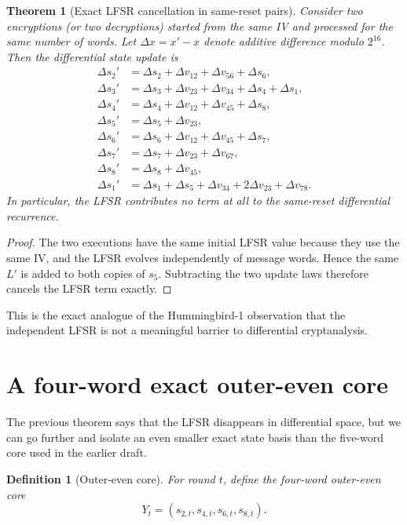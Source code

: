 \documentclass[11pt]{article}
\newtheorem{theorem}{Theorem}
\newtheorem{definition}{Definition}
\begin{document}
\begin{theorem}[Exact LFSR cancellation in same-reset pairs]
Consider two encryptions (or two decryptions) started from the same IV and processed for the same number of words. Let $\Delta x = x' - x$ denote additive difference modulo $2^{16}$. Then the differential state update is
\begin{align*}
\Delta s_2' &= \Delta s_2 + \Delta v_{12} + \Delta v_{56} + \Delta s_6,\\
\Delta s_3' &= \Delta s_3 + \Delta v_{23} + \Delta v_{34} + \Delta s_4 + \Delta s_1,\\
\Delta s_4' &= \Delta s_4 + \Delta v_{12} + \Delta v_{45} + \Delta s_8,\\
\Delta s_5' &= \Delta s_5 + \Delta v_{23},\\
\Delta s_6' &= \Delta s_6 + \Delta v_{12} + \Delta v_{45} + \Delta s_7,\\
\Delta s_7' &= \Delta s_7 + \Delta v_{23} + \Delta v_{67},\\
\Delta s_8' &= \Delta s_8 + \Delta v_{45},\\
\Delta s_1' &= \Delta s_1 + \Delta s_5 + \Delta v_{34} + 2\Delta v_{23} + \Delta v_{78}.
\end{align*}
In particular, the LFSR contributes no term at all to the same-reset differential recurrence.
\end{theorem}

\begin{proof}
The two executions have the same initial LFSR value because they use the same IV, and the LFSR evolves independently of message words. Hence the same $L'$ is added to both copies of $s_5$. Subtracting the two update laws therefore cancels the LFSR term exactly.
\end{proof}

This is the exact analogue of the Hummingbird-1 observation that the independent LFSR is not a meaningful barrier to differential cryptanalysis.

\section{A four-word exact outer-even core}
The previous theorem says that the LFSR disappears in differential space, but we can go further and isolate an even smaller exact state basis than the five-word core used in the earlier draft.

\begin{definition}[Outer-even core]
For round $t$, define the four-word outer-even core
\[
Y_t=(s_{2,t},s_{4,t},s_{6,t},s_{8,t}).
\]
\end{definition}
\end{document}
